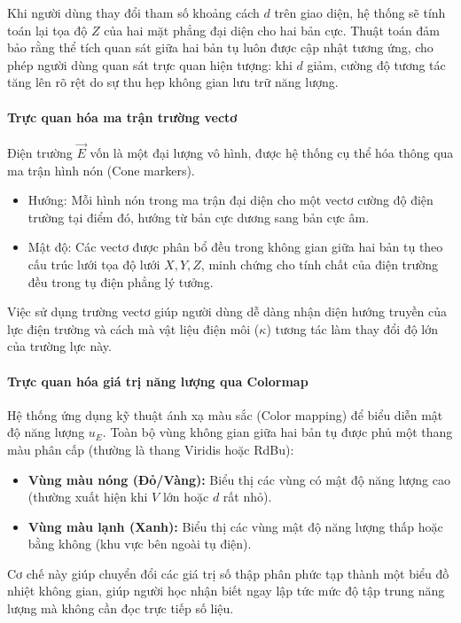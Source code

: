 Khi người dùng thay đổi tham số khoảng cách $d$ trên giao diện, hệ thống sẽ tính toán lại tọa độ $Z$ của hai mặt phẳng đại diện cho hai bản cực. Thuật toán đảm bảo rằng thể tích quan sát giữa hai bản tụ luôn được cập nhật tương ứng, cho phép người dùng quan sát trực quan hiện tượng: khi $d$ giảm, cường độ tương tác tăng lên rõ rệt do sự thu hẹp không gian lưu trữ năng lượng.

\paragraph{Trực quan hóa ma trận trường vectơ\\}
Điện trường $\vec{E}$ vốn là một đại lượng vô hình, được hệ thống cụ thể hóa thông qua ma trận hình nón (Cone markers).
\begin{itemize}
    \item Hướng: Mỗi hình nón trong ma trận đại diện cho một vectơ cường độ điện trường tại điểm đó, hướng từ bản cực dương sang bản cực âm.
    \item Mật độ: Các vectơ được phân bổ đều trong không gian giữa hai bản tụ theo cấu trúc lưới tọa độ lưới $X, Y, Z$, minh chứng cho tính chất của điện trường đều trong tụ điện phẳng lý tưởng.
\end{itemize}
Việc sử dụng trường vectơ giúp người dùng dễ dàng nhận diện hướng truyền của lực điện trường và cách mà vật liệu điện môi ($\kappa$) tương tác làm thay đổi độ lớn của trường lực này.

\paragraph{Trực quan hóa giá trị năng lượng qua Colormap\\}
Hệ thống ứng dụng kỹ thuật ánh xạ màu sắc (Color mapping) để biểu diễn mật độ năng lượng $u_E$. Toàn bộ vùng không gian giữa hai bản tụ được phủ một thang màu phân cấp (thường là thang Viridis hoặc RdBu):
\begin{itemize}
    \item \textbf{Vùng màu nóng (Đỏ/Vàng):} Biểu thị các vùng có mật độ năng lượng cao (thường xuất hiện khi $V$ lớn hoặc $d$ rất nhỏ).
    \item \textbf{Vùng màu lạnh (Xanh):} Biểu thị các vùng mật độ năng lượng thấp hoặc bằng không (khu vực bên ngoài tụ điện).
\end{itemize}

Cơ chế này giúp chuyển đổi các giá trị số thập phân phức tạp thành một biểu đồ nhiệt không gian, giúp người học nhận biết ngay lập tức mức độ tập trung năng lượng mà không cần đọc trực tiếp số liệu.




